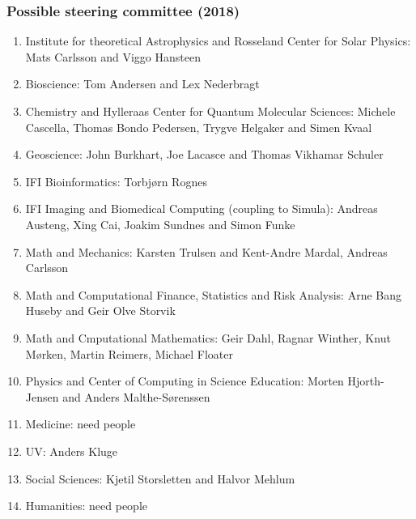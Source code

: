 \documentclass{beamer}
\begin{document}
\begin{frame}
\frametitle{Possible steering committee (2018)}

\begin{enumerate}
\item Institute for theoretical Astrophysics and Rosseland Center for Solar Physics: Mats Carlsson and Viggo Hansteen

\item Bioscience: Tom Andersen and Lex Nederbragt

\item Chemistry and Hylleraas Center for Quantum Molecular Sciences: Michele Cascella, Thomas Bondo Pedersen, Trygve Helgaker and Simen Kvaal

\item Geoscience: John Burkhart, Joe Lacasce and Thomas Vikhamar Schuler

\item IFI Bioinformatics: Torbjørn Rognes

\item IFI Imaging and Biomedical Computing (coupling to Simula): Andreas Austeng, Xing Cai, Joakim Sundnes and Simon Funke

\item Math and Mechanics: Karsten Trulsen and Kent-Andre Mardal, Andreas Carlsson

\item Math and Computational Finance, Statistics and Risk Analysis: Arne Bang Huseby and Geir Olve Storvik

\item Math and Cmputational Mathematics: Geir Dahl, Ragnar Winther, Knut Mørken, Martin Reimers, Michael Floater

\item Physics and Center of Computing in Science Education: Morten Hjorth-Jensen and  Anders Malthe-Sørenssen

\item Medicine: need people

\item UV: Anders Kluge

\item Social Sciences: Kjetil Storsletten and Halvor Mehlum

\item Humanities: need people
\end{enumerate}

\noindent
\end{frame}
\end{document}
